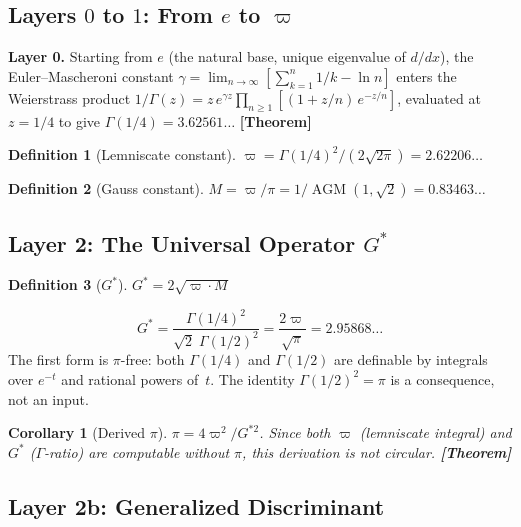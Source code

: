 \documentclass[12pt]{article}
\DeclareMathOperator{\AGM}{AGM}
\newtheorem{corollary}[theorem]{Corollary}
\theoremstyle{definition}
\newtheorem{definition}{Definition}[section]
\theoremstyle{remark}
\newcommand{\epi}[1]{\textnormal{{\small\sffamily\bfseries\color{ftdblue}[#1]}}}
\begin{document}
\subsection{Layers $0$ to $1$: From $e$ to $\varpi$}

\textbf{Layer 0.}
Starting from $e$ (the natural base, unique eigenvalue of $d/dx$), the
Euler--Mascheroni constant $\gamma = \lim_{n\to\infty}[\sum_{k=1}^n 1/k - \ln n]$ enters the Weierstrass product
$1/\Gamma(z) = z\,e^{\gamma z}\prod_{n\geq 1}[(1+z/n)\,e^{-z/n}]$,
evaluated at $z = 1/4$ to give $\Gamma(1/4) = 3.62561\ldots$ \epi{Theorem}

\begin{definition}[Lemniscate constant]\label{def:varpi}
$\varpi = \Gamma(1/4)^2/(2\sqrt{2\pi}) = 2.62206\ldots$
\end{definition}

\begin{definition}[Gauss constant]\label{def:gauss}
$M = \varpi/\pi = 1/\AGM(1,\sqrt{2}) = 0.83463\ldots$
\end{definition}

\subsection{Layer 2: The Universal Operator $G^{*}$}

\begin{definition}[$G^{*}$]\label{def:gstar}
$\displaystyle G^{*} = 2\sqrt{\varpi\cdot M}$
\end{definition}

\begin{equation}
\boxed{G^{*} = \frac{\Gamma(1/4)^2}{\sqrt{2}\;\Gamma(1/2)^2} = \frac{2\varpi}{\sqrt{\pi}} = 2.95868\ldots}
\end{equation}
The first form is $\pi$-free: both $\Gamma(1/4)$ and $\Gamma(1/2)$ are definable by integrals over $e^{-t}$ and rational powers of~$t$. The identity $\Gamma(1/2)^2 = \pi$ is a consequence, not an input.

\begin{corollary}[Derived $\pi$]
$\pi = 4\varpi^2/G^{*2}$. Since both $\varpi$ (lemniscate integral) and $G^{*}$ ($\Gamma$-ratio) are computable without $\pi$, this derivation is not circular. \epi{Theorem}
\end{corollary}

\subsection{Layer 2b: Generalized Discriminant}
\end{document}
